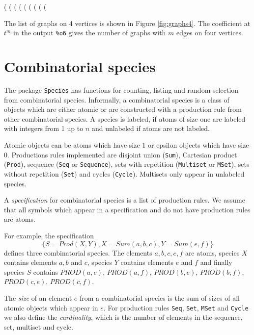 \documentclass[11pt]{article}
\newcommand{\command}[1]{\texttt{#1}}
\newcommand{\DEF}[1]{{\em #1}}
\begin{document}
\begin{example}
(%
(%
(%
(%
(%
(%
(%
(%
(%
\end{example}
%
The list of graphs on 4 vertices is shown in Figure \ref{fig:graphs4}.
The coefficient at $t^m$ in the output \verb|%o6|
gives the number of graphs with $m$ edges on four vertices.

\section{Combinatorial species}

The package \command{Species} has functions for counting, listing and
random selection from combinatorial species. Informally, a
combinatorial species is a class of objects which are either atomic or
are constructed with a production rule from other combinatorial
species. A species is labeled, if atoms of size one are labeled with
integers from 1 up to $n$ and unlabeled if atoms are not labeled.

Atomic objects can be atoms which have size 1 or epsilon objects which
have size 0. Productions rules implemented are disjoint union
(\command{Sum}), Cartesian product (\command{Prod}), sequence
(\command{Seq} or \command{Sequence}), sets with repetition
(\command{Multiset} or \command{MSet}), sets without repetition
(\command{Set}) and cycles (\command{Cycle}). Multisets only appear in
unlabeled species.

A \DEF{specification} for combinatorial species is a list of
production rules. We assume that all symbols which appear in a
specification and do not have production rules are atoms.

For example, the specification
$$
\{S=Prod(X, Y), X=Sum(a, b, c), Y=Sum(e, f)\}
$$
defines three combinatorial species. The elements $a, b, c, e, f$ are
atoms, species $X$ contains elements $a, b$ and $c$, species $Y$
contains elements $e$ and $f$ and finally species $S$ contains
$PROD(a, e)$, $PROD(a, f)$, $PROD(b, e)$, $PROD(b, f)$, $PROD(c, e)$,
$PROD(c, f)$.

The \DEF{size} of an element $e$ from a combinatorial species is the
sum of sizes of all atomic objects which appear in $e$. For production
rules \command{Seq}, \command{Set}, \command{MSet} and \command{Cycle}
we also define the \DEF{cardinality}, which is the number of elements
in the sequence, set, multiset and cycle.
\end{document}
